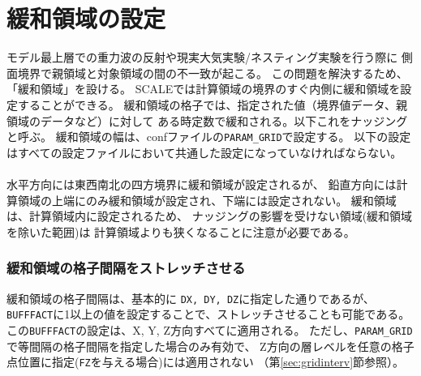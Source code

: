 \section{緩和領域の設定}
\label{sec:buffer}
モデル最上層での重力波の反射や現実大気実験/ネスティング実験を行う際に
側面境界で親領域と対象領域の間の不一致が起こる。
この問題を解決するため、「緩和領域」を設ける。
SCALEでは計算領域の境界のすぐ内側に緩和領域を設定することができる。
緩和領域の格子では、指定された値（境界値データ、親領域のデータなど）に対して
ある時定数で緩和される。以下これをナッジングと呼ぶ。
緩和領域の幅は、confファイルの\verb|PARAM_GRID|で設定する。
以下の設定はすべての設定ファイルにおいて共通した設定になっていなければならない。\\

\\

水平方向には東西南北の四方境界に緩和領域が設定されるが、
鉛直方向には計算領域の上端にのみ緩和領域が設定され、下端には設定されない。
%
緩和領域は、計算領域内に設定されるため、
ナッジングの影響を受けない領域(緩和領域を除いた範囲)は
計算領域よりも狭くなることに注意が必要である。

\subsubsection{緩和領域の格子間隔をストレッチさせる}
緩和領域の格子間隔は、基本的に \verb|DX, DY, DZ|に指定した通りであるが、
\verb|BUFFFACT|に1以上の値を設定することで、ストレッチさせることも可能である。
この\verb|BUFFFACT|の設定は、X, Y, Z方向すべてに適用される。
ただし、\verb|PARAM_GRID|で等間隔の格子間隔を指定した場合のみ有効で、
Z方向の層レベルを任意の格子点位置に指定(\verb|FZ|を与える場合)には適用されない
（第\ref{sec:gridinterv}節参照）。

